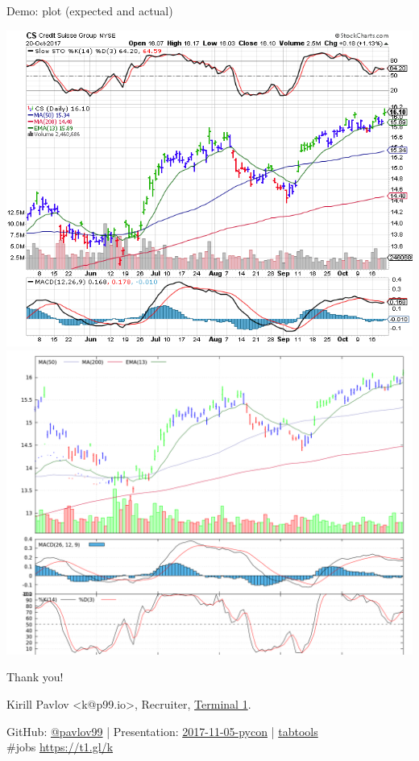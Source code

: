\documentclass[unicode, notheorems, aspectratio=169]{beamer}
\begin{document}
\begin{frame}{Demo: plot (expected and actual)}
\begin{center}
	\includegraphics[width=.5\textwidth]{./images/credit-suisse-stockcharts}
	\includegraphics[width=.5\textwidth]{./images/metrics}
\end{center}
\end{frame}

\begin{frame}
\begin{center}
{\huge Thank you!}

\vfill
Kirill Pavlov <k@p99.io>, Recruiter, \href{https://t1.gl/k}{Terminal 1}.

{\small
GitHub: \href{https://github.com/pavlov99}{@pavlov99} |
Presentation: \href{https://github.com/pavlov99/presentations/tree/master/2017-11-05-pycon}{2017-11-05-pycon} |
\href{https://github.com/pavlov99/tabtools}{tabtools} \\
\#jobs \href{https://t1.gl/k}{https://t1.gl/k}
}
\end{center}
\end{frame}
\end{document}
